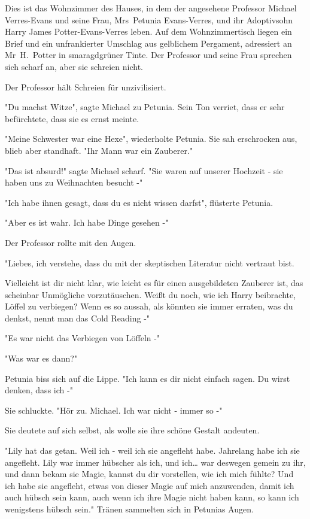 {Dies ist das Wohnzimmer des Hauses, in dem der angesehene Professor Michael Verres-Evans und seine Frau, Mrs~Petunia Evans-Verres, und ihr Adoptivsohn Harry James Potter-Evans-Verres leben. Auf dem Wohnzimmertisch liegen ein Brief und ein unfrankierter Umschlag aus gelblichem Pergament, adressiert an Mr~H.~Potter in smaragdgrüner Tinte. Der Professor und seine Frau sprechen sich scharf an, aber sie schreien nicht.

Der Professor hält Schreien für unzivilisiert.

"Du machst Witze", sagte Michael zu Petunia. Sein Ton verriet, dass er sehr befürchtete, dass sie es ernst meinte.

"Meine Schwester war eine Hexe", wiederholte Petunia. Sie sah erschrocken aus, blieb aber standhaft. "Ihr Mann war ein Zauberer."

"Das ist absurd!" sagte Michael scharf. "Sie waren auf unserer Hochzeit - sie haben uns zu Weihnachten besucht -"

"Ich habe ihnen gesagt, dass du es nicht wissen darfst", flüsterte Petunia.

"Aber es ist wahr. Ich habe Dinge gesehen -"

Der Professor rollte mit den Augen.

"Liebes, ich verstehe, dass du mit der skeptischen Literatur nicht vertraut bist.

Vielleicht ist dir nicht klar, wie leicht es für einen ausgebildeten Zauberer ist, das scheinbar Unmögliche vorzutäuschen. Weißt du noch, wie ich Harry beibrachte, Löffel zu verbiegen? Wenn es so aussah, als könnten sie immer erraten, was du denkst, nennt man das Cold Reading -"

"Es war nicht das Verbiegen von Löffeln -"

"Was war es dann?"

Petunia biss sich auf die Lippe. "Ich kann es dir nicht einfach sagen. Du wirst denken, dass ich -"

Sie schluckte. "Hör zu. Michael. Ich war nicht - immer so -"

Sie deutete auf sich selbst, als wolle sie ihre schöne Gestalt andeuten.

"Lily hat das getan. Weil ich - weil ich sie angefleht habe. Jahrelang habe ich sie angefleht. Lily war immer hübscher als ich, und ich… war deswegen gemein zu ihr, und dann bekam sie Magie, kannst du dir vorstellen, wie ich mich fühlte? Und ich habe sie angefleht, etwas von dieser Magie auf mich anzuwenden, damit ich auch hübsch sein kann, auch wenn ich ihre Magie nicht haben kann, so kann ich wenigstens hübsch sein." Tränen sammelten sich in Petunias Augen.

}
